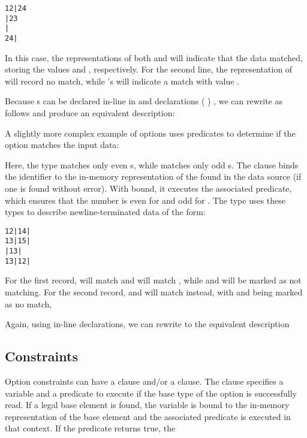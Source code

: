 \begin{verbatim}
12|24
|23
|
24|
\end{verbatim}
\noindent
In this case, the representations of both  and  will
indicate that the data matched, storing the values  and
, respectively.  For the second line, the representation of
 will record no match, while 's will indicate a match with
value . 

Because \Popt{}s can be declared in-line in \Pstruct{} and \Punion{}
declarations (\cf{}  ) , we can rewrite  as follows and
produce an equivalent description:


A slightly more complex example of options uses predicates to
determine if the option matches the input data:


\noindent
Here, the type  matches only even s, while
 matches only odd s.  The \Psome{} clause binds
the identifier  to the in-memory representation of the
 found in the data source (if one is found without
error).  With  bound, it executes the associated predicate,
which ensures that the number is even for  and odd for
. 
The type  uses
these types to describe newline-terminated data of the form:
\begin{verbatim}
12|14|
13|15|
|13|
13|12|
\end{verbatim}
For the first record,  will match  and  will
match , while  and  will be marked as not
matching. For the second record,  and  will match 
instead, with  and  being marked as no match, \etc{}

Again, using in-line declarations, we can rewrite  to the
equivalent description 


\subsection{Constraints}
Option constraints can have a \Psome{} clause and/or a \Pnone{}
clause.  The \Psome{} clause specifies a variable and a predicate to
execute if the base type of the option is successfully read.  If a
legal base element is found, the variable is bound to the in-memory
representation of the base element and the associated predicate is
executed in that context.  If the predicate returns true, the

